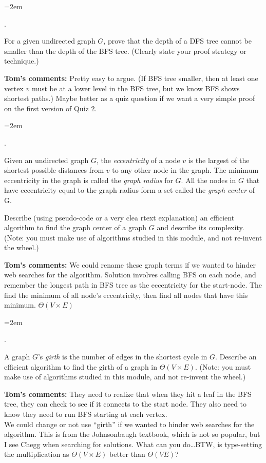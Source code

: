 \documentclass[12pt]{article}
\newcounter{quesnum}
\newcommand{\question}[2][??]{
\begin{list}{\labelitemi}{\leftmargin=2em}
\item [\arabic{quesnum}.] {#2}
\end{list}
\addtocounter{quesnum}{1}
}
\begin{document}
\question[1]{
 For a given undirected graph $G$, prove that the depth of a DFS tree cannot be smaller than the depth of the BFS tree.  (Clearly state your proof strategy or technique.)
 
 {\bf Tom's comments:}  Pretty easy to argue.  (If BFS tree smaller, then at least one vertex $v$ must be at a lower level in the BFS tree, but we know BFS shows shortest paths.) Maybe better as a quiz question if we want a very simple proof on the first version of Quiz 2.

}


\question[1]{
Given an undirected graph $G$, the {\em eccentricity} of a node $v$ is the largest of the shortest possible distances from $v$ to any other node in the graph. The minimum eccentricity in the graph is called the  {\em graph radius} for $G$. All the nodes in $G$ that have eccentricity equal to the graph radius form a set called the {\em graph center} of G.

Describe (using pseudo-code or a very clea rtext explanation) an efficient algorithm to find the graph center of a graph $G$ and describe its complexity.  (Note: you must make use of algorithms studied in this module, and not  re-invent the wheel.)

{\bf Tom's comments:}  We could rename these graph terms if we wanted to hinder web searches for the algorithm.  Solution involves calling BFS on each node, and remember the longest path in BFS tree as the eccentricity for the start-node. The find the minimum of all node's eccentricity, then find all nodes that have this minimum.  $\Theta(V \times E)$
}



\question[1]{
A graph $G$'s {\em girth}  is the number of edges in the shortest cycle in $G$.   Describe an efficient algorithm to find the girth of a graph in $\Theta(V \times E)$.  (Note: you must make use of algorithms studied in this module, and not  re-invent the wheel.)

 {\bf Tom's comments:}  They need to realize that when they hit a leaf in the BFS tree, they can check to see if it connects to the start node.  They also need to know they need to run BFS starting at each vertex. \\
 We could change or not use ``girth'' if we wanted to hinder web searches for the algorithm.  This is from the Johnsonbaugh textbook, which is not so popular, but I see Chegg when searching for solutions.  What can you do\ldots  BTW, is type-setting the multiplication as $\Theta(V \times E)$ better than $\Theta(VE)$?
}
\end{document}
